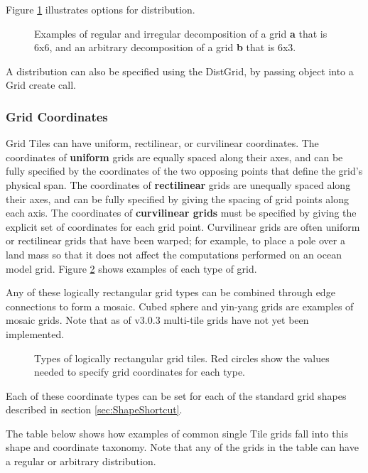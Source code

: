 Figure \ref{fig:GridDecomps} illustrates options for distribution.
\begin{figure}
\caption{Examples of regular and irregular decomposition of
a grid {\bf a} that is 6x6, and an arbitrary decomposition of
a grid {\bf b} that is 6x3.}
\label{fig:GridDecomps}
\end{figure}

A distribution can also be specified using the DistGrid, by passing
object into a Grid create call.

\subsubsection{Grid Coordinates}
\label{sec:coordspec}
Grid Tiles can have uniform, rectilinear, or curvilinear
coordinates.  The coordinates of {\bf uniform} grids are equally spaced along
their axes, and can be fully specified by the coordinates of the two opposing points
that define the grid's physical span.  The coordinates of {\bf rectilinear} grids
are unequally spaced along their axes, and can be fully specified by giving
the spacing of grid points along each axis.  The coordinates of {\bf curvilinear 
grids} must be specified by giving the explicit set of coordinates for each
grid point.  Curvilinear grids are often uniform or rectilinear grids that 
have been warped; for example, to place a pole over a land mass so that it
does not affect the computations performed on an ocean model grid.  Figure
\ref{fig:LogRectGrids} shows examples of each type of grid.

Any of these logically rectangular grid types can be combined through edge
connections to form a mosaic.  Cubed sphere and yin-yang grids are examples
of mosaic grids.  Note that as of v3.0.3 multi-tile grids have not yet been
implemented.
 
\begin{figure}
\caption{Types of logically rectangular grid tiles.  Red circles show the
values needed to specify grid coordinates for each type.}
\label{fig:LogRectGrids}
\end{figure}

Each of these coordinate types can be set for each of the standard grid shapes
described in section \ref{sec:ShapeShortcut}.  

The table below shows how examples of common single Tile grids fall 
into this shape and coordinate taxonomy.  Note that any
of the grids in the table can have a regular or arbitrary distribution.

